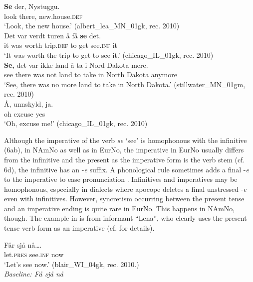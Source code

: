 \documentclass[output=paper]{langscibook}
\begin{document}
\ea%
    \label{ex:eide:6}
    \ea 
	    \gll \textbf{Se} der, Nystuggu.\\
		look there, new.house.\textsc{def}\\  
	    \glt ‘Look, the new house.' ({{albert\_lea\_MN\_01gk}}, rec. 2010)\\
    \ex    
	    \gll Det var verdt turen å få \textbf{se} det.          \\
             it was worth trip.\textsc{def} to get see.\textsc{inf} it\\
        \glt ‘It was worth the trip to get to see it.’ ({{chicago\_IL\_01gk}}, rec. 2010)\\ 
    \ex 
        \gll \textbf{Se,} det var ikke land å ta i Nord-Dakota mere.      \\
              see there was not land to take in {North Dakota} anymore    \\
        \glt  ‘See, there was no more land to take in North Dakota.’ ({stillwater\_MN\_01gm}, rec. 2010)\\
    \ex 
        \gll Å, unnskyld, ja.\\
             oh excuse yes           \\
        \glt ‘Oh, excuse me!’    ({{chicago\_IL\_01gk}}, rec. 2010)\\    
    \z 
\z

Although the imperative of the verb \textit{se} ‘see’ is homophonous with the infinitive (6ab), in NAmNo as well as in EurNo, the imperative in EurNo usually differs from the infinitive and the present as the imperative form is the verb stem (cf. 6d), the infinitive has an -\textit{e} suffix. A phonological rule sometimes adds a final -\textit{e} to the imperative to ease pronunciation \citep{Rice2003}. Infinitives and imperatives may be homophonous, especially in dialects where apocope deletes a final unstressed -\textit{e} even with infinitives. However, syncretism occurring between the present tense and an imperative ending is quite rare in EurNo. This happens in NAmNo, though. The example in  is from informant “Lena”, who clearly uses the present tense verb form as an imperative (cf. \citealt{EideHjelde2015Verb} for details).  


\ea \label{ex:eide:7} 
	\gll Får sjå nå….\\
         let.\textsc{pres} see.\textsc{inf} now\\
	\glt ‘Let’s see now.’     (blair\_WI\_04gk, rec. 2010.)\\
    \textit{Baseline: Få sjå nå}
\z
\end{document}
